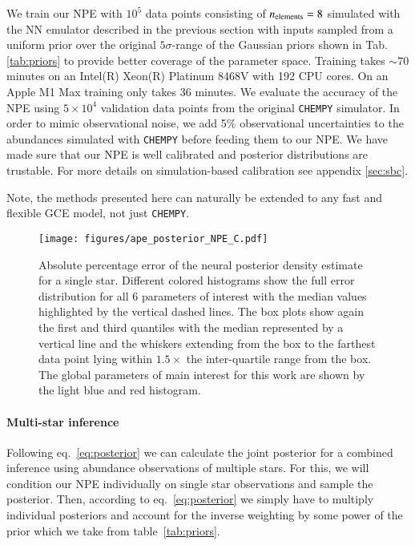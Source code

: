 \documentclass{aa}
\begin{document}
We train our NPE with $10^5$ data points consisting of $n_{\rm elements}=8$ simulated with the NN emulator described in the previous section with inputs sampled from a uniform prior over the original $5\sigma$-range of the Gaussian priors shown in Tab. \ref{tab:priors} to provide better coverage of the parameter space. Training takes $\sim70$ minutes on an Intel(R) Xeon(R) Platinum 8468V with 192 CPU cores. On an Apple M1 Max training only takes 36 minutes.
We evaluate the accuracy of the NPE using $5\times10^4$ validation data points from the original \texttt{CHEMPY} simulator. In order to mimic observational noise, we add 5\% observational uncertainties to the abundances simulated with \texttt{CHEMPY} before feeding them to our NPE.
We have made sure that our NPE is well calibrated and posterior distributions are trustable. For more details on simulation-based calibration see appendix \ref{sec:sbc}.

Note, the methods presented here can naturally be extended to any fast and flexible GCE model, not just \texttt{CHEMPY}.


\begin{figure}[]
     \centering
     \texttt{[image: figures/ape\_posterior\_NPE\_C.pdf]}
     \vspace{-.5cm}
     \caption{Absolute percentage error of the neural posterior density estimate for a single star. Different colored histograms show the full error distribution for all 6 parameters of interest with the median values highlighted by the vertical dashed lines. The box plots show again the first and third quantiles with the median represented by a vertical line and the whiskers extending from the box to the farthest data point lying within $1.5\times$ the inter-quartile range from the box. The global parameters of main interest for this work are shown by the light blue and red histogram.}
     \label{fig:posterior_APE}
\end{figure}

\paragraph{Multi-star inference}
Following eq.~\ref{eq:posterior} we can calculate the joint posterior for a combined inference using abundance observations of multiple stars. For this, we will condition our NPE individually on single star observations and sample the posterior. Then, according to eq.~\ref{eq:posterior} we simply have to multiply individual posteriors and account for the inverse weighting by some power of the prior which we take from table~\ref{tab:priors}. 
\end{document}
